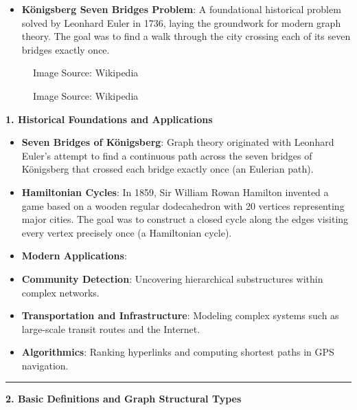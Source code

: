 \documentclass[
]{book}
\providecommand{\tightlist}{%
  \setlength{\itemsep}{0pt}\setlength{\parskip}{0pt}}
\theoremstyle{definition}
\theoremstyle{definition}
\theoremstyle{definition}
\theoremstyle{definition}
\theoremstyle{remark}
\begin{document}
\begin{itemize}
\tightlist
\item
  \textbf{Königsberg Seven Bridges Problem}: A foundational historical problem solved by Leonhard Euler in 1736, laying the groundwork for modern graph theory. The goal was to find a walk through the city crossing each of its seven bridges exactly once.
\end{itemize}

\begin{figure}
\centering
{Image Source: Wikipedia}
\caption{Image Source: Wikipedia}
\end{figure}

\textbf{1. Historical Foundations and Applications}

\begin{itemize}
\item
  \textbf{Seven Bridges of Königsberg}: Graph theory originated with Leonhard Euler's attempt to find a continuous path across the seven bridges of Königsberg that crossed each bridge exactly once (an Eulerian path).
\item
  \textbf{Hamiltonian Cycles}: In 1859, Sir William Rowan Hamilton invented a game based on a wooden regular dodecahedron with 20 vertices representing major cities. The goal was to construct a closed cycle along the edges visiting every vertex precisely once (a Hamiltonian cycle).
\item
  \textbf{Modern Applications}:
\item
  \textbf{Community Detection}: Uncovering hierarchical substructures within complex networks.
\item
  \textbf{Transportation and Infrastructure}: Modeling complex systems such as large-scale transit routes and the Internet.
\item
  \textbf{Algorithmics}: Ranking hyperlinks and computing shortest paths in GPS navigation.
\end{itemize}

\begin{center}\rule{0.5\linewidth}{0.5pt}\end{center}

\textbf{2. Basic Definitions and Graph Structural Types}
\end{document}
